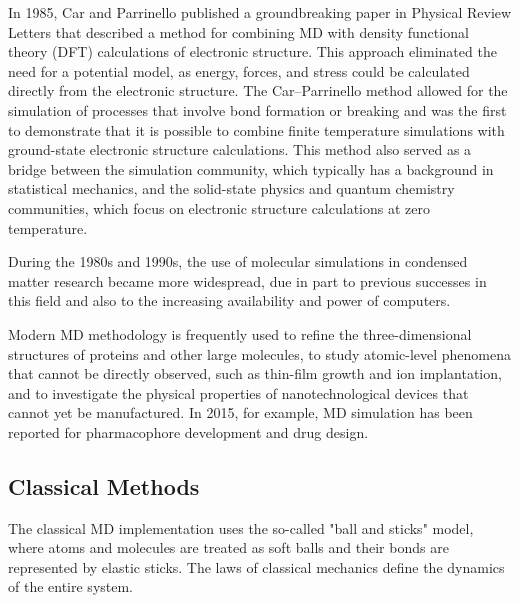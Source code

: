 In 1985, Car and Parrinello published a groundbreaking paper in Physical
Review Letters that described a method for combining MD with density
functional theory (DFT) calculations of electronic structure. This approach
eliminated the need for a potential model, as energy, forces, and stress
could be calculated directly from the electronic structure. The Car–Parrinello
method allowed for the simulation of processes that involve bond formation or
breaking and was the first to demonstrate that it is possible to combine
finite temperature simulations with ground-state electronic structure
calculations. This method also served as a bridge between the simulation
community, which typically has a background in statistical mechanics, and the
solid-state physics and quantum chemistry communities, which focus on
electronic structure calculations at zero temperature.

During the 1980s and 1990s, the use of molecular simulations in condensed
matter research became more widespread, due in part to previous successes in
this field and also to the increasing availability and power of computers.

Modern MD methodology is frequently used to refine the three-dimensional
structures of proteins and other large molecules, to study atomic-level
phenomena that cannot be directly observed, such as thin-film growth and ion
implantation, and to investigate the physical properties of nanotechnological
devices that cannot yet be manufactured. In 2015, for example, MD simulation
has been reported for pharmacophore development and drug design.

\subsection{Classical Methods}

The classical MD implementation uses the so-called "ball and sticks" model,
where atoms and molecules are treated as soft balls and their bonds are
represented by elastic sticks. The laws of classical mechanics define the
dynamics of the entire system.

